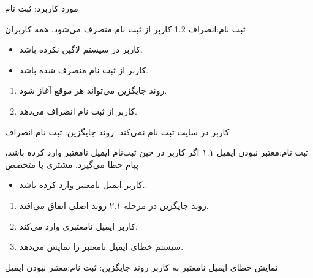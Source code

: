 {{\begin{itemize}
		
\end{itemize}}
{مورد کاربرد: ثبت نام}


\alternativeflow
{
	ثبت نام:انصراف
}
{1.2}
{
	کاربر از ثبت نام منصرف می‌شود.
}
{
	همه کاربران
}
{}
{
	\begin{itemize}
		\vspace*{-0.6cm}
		\item 
		کاربر در سیستم لاگین نکرده باشد.
		\item
		کاربر از ثبت نام  منصرف شده باشد.
	\end{itemize}
}
{
	\vspace*{-0.6cm}
	\begin{enumerate}
		\item 
		روند جایگزین می‌تواند هر موقع آغاز شود.
		\item
		کاربر از ثبت نام  انصراف می‌دهد.
	\end{enumerate}
}
{
	کاربر در سایت ثبت نام نمی‌کند.
}
{
	روند جایگزین: ثبت نام:انصراف
}

\alternativeflow
{
	ثبت‌ نام:معتبر نبودن ایمیل
}
{۱.۱}
{
	اگر کاربر در حین ثبت‌نام ایمیل نامعتبر وارد کرده باشد، پیام خطا می‌گیرد.
}
{
	مشتری یا متخصص
}
{}
{
	\begin{itemize}
	
		\item
		کاربر ایمیل نامعتبر وارد کرده باشد..
	\end{itemize}
}
{
	\vspace*{-0.6cm}
	\begin{enumerate}
		\item 
		روند جایگزین در مرحله ۲.۱ روند اصلی اتفاق می‌افتد.
		\item
		کاربر ایمیل نامعتبری وارد می‌کند.
		\item 
		سیستم خطای ایمیل نامعتبر را نمایش می‌دهد.
	\end{enumerate}
}
{
	نمایش خطای ایمیل نامعتبر به کاربر
}
{
	روند جایگزین: 	ثبت‌ نام:معتبر نبودن ایمیل
}
}

